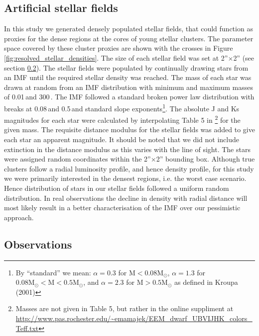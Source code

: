 \subsection{Artificial stellar fields}

In this study we generated densely populated stellar fields, that could function as proxies for the dense regions at the cores of young stellar clusters. 
The parameter space covered by these cluster proxies are shown with the crosses in Figure \ref{fig:resolved_stellar_densities}. 
The size of each stellar field was set at 2''$\times$2'' (see section \ref{sec:telescope}). 
The stellar fields were populated by continually drawing stars from an IMF until the required stellar density was reached. 
The mass of each star was drawn at random from an IMF distribution with minimum and maximum masses of 0.01\,\msun and 300\,\msun. 
The IMF followed a standard \citet{kroupa2001} broken power law distribution with breaks at 0.08\,\msun and 0.5\,\msun and standard slope exponents\footnote{By ``standard'' we mean: $\alpha=0.3$ for $\mathrm{M} < 0.08 \mathrm{M}_\odot$, $\alpha=1.3$ for $0.08\mathrm{M}_\odot < \mathrm{M} < 0.5 \mathrm{M}_\odot$, and $\alpha=2.3$ for $\mathrm{M} > 0.5 \mathrm{M}_\odot$ as defined in Kroupa (2001)}. 
The absolute J and Ks magnitudes for each star were calculated by interpolating Table 5 in \citet{pecaut2013}\footnote{Masses are not given in Table 5, but rather in the online suppliment at \url{http://www.pas.rochester.edu/~emamajek/EEM_dwarf_UBVIJHK_colors_Teff.txt}} for the given mass. 
The requisite distance modulus for the stellar fields was added to give each star an apparent magnitude. 
It should be noted that we did not include extinction in the distance modulus as this varies with the line of sight. 
The stars were assigned random coordinates within the 2''$\times$2'' bounding box. 
Although true clusters follow a radial luminosity profile, and hence density profile, for this study we were primarily interested in the densest regions, i.e. the worst case scenario. 
Hence distribution of stars in our stellar fields followed a uniform random distribution. 
In real observations the decline in density with radial distance will most likely result in a better characterisation of the IMF over our pessimistic approach.


\subsection{Observations}
\label{sec:telescope}

